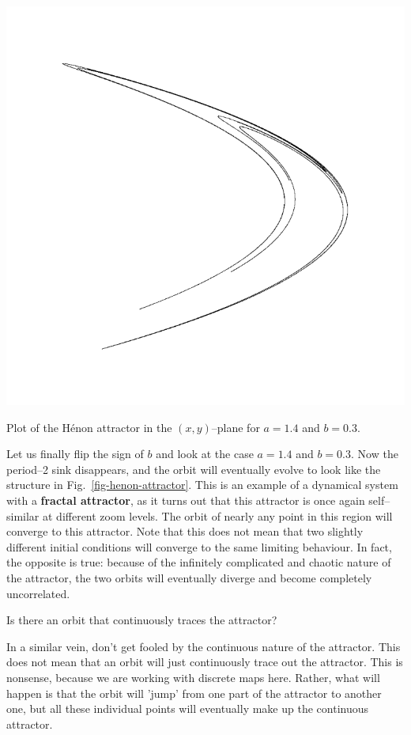 \begin{marginfigure}
\centering
\includegraphics{dynamic/figures/henon_attractor}
\caption{Plot of the H\'{e}non attractor in the $(x,y)$--plane for $a=1.4$ and $b=0.3$.}
\label{fig-henon-attractor}
\end{marginfigure} 

Let us finally flip the sign of $b$ and look at the case $a=1.4$ and $b=0.3$. Now the period--2 sink disappears, and the orbit will eventually evolve to look like the structure in Fig.~\ref{fig-henon-attractor}. This is an example of a dynamical system with a \textbf{fractal attractor}, as it turns out that this attractor is once again self--similar at different zoom levels. The orbit of nearly any point in this region will converge to this attractor. Note that this does not mean that two slightly different initial conditions will converge to the same limiting behaviour. In fact, the opposite is true: because of the infinitely complicated and chaotic nature of the attractor, the two orbits will eventually diverge and become completely uncorrelated.

\begin{cue}
Is there an orbit that continuously traces the attractor?  
\end{cue}

In a similar vein, don't get fooled by the continuous nature of the attractor. This does not mean that an orbit will just continuously trace out the attractor. This is nonsense, because we are working with discrete maps here. Rather, what will happen is that the orbit will 'jump' from one part of the attractor to another one, but all these individual points will eventually make up the continuous attractor.

